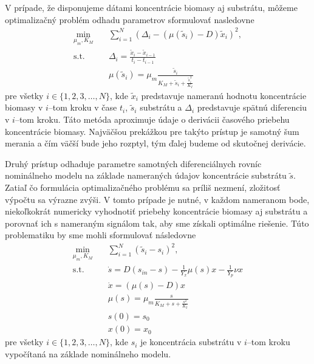 V prípade, že disponujeme dátami koncentrácie biomasy aj substrátu, môžeme optimalizačný problém odhadu parametrov sformulovať nasledovne
\begin{equation}
\label{eq:twostep_der_app}
	\begin{split}
		\min_{\mu_{m},K_{M}} \quad &\sum_{i=1}^{N} \left(\Delta_{i} - \left(\mu(\tilde{s}_{i}) - D\right)\tilde{x}_{i}\right)^2, \\
		\text{s.t.} \quad &\Delta_{i} = \frac{\tilde{x}_{i} - \tilde{x}_{i-1}}{t_{i} - t_{i-1}} \\
		\quad &\mu(\tilde{s}_{i})=\mu_{m}\frac{\tilde{s}_{i}}{K_{M} + \tilde{s}_{i} + \frac{\tilde{s}_{i}^2}{K_{I}}}
	\end{split}
\end{equation} 
pre všetky $ i \in \lbrace 1,2,3,\dots,N \rbrace $, kde $ \tilde{x}_{i} $ predstavuje nameranú hodnotu koncentrácie biomasy v $ i $--tom kroku v čase $ t_i $, $ \tilde{s}_{i} $ substrátu a $ \Delta_{i} $ predstavuje spätnú diferenciu v $ i $--tom kroku. Táto metóda aproximuje údaje o derivácii časového priebehu koncentrácie biomasy. Najväčšou prekážkou pre takýto prístup je samotný šum merania a čím väčší bude jeho rozptyl, tým ďalej budeme od skutočnej derivácie.

Druhý prístup odhaduje parametre samotných diferenciálnych rovníc nominálneho modelu na základe nameraných údajov koncentrácie substrátu $ \tilde{s} $. Zatiaľ čo formulácia optimalizačného problému sa príliš nezmení, zložitosť výpočtu sa výrazne zvýši. V tomto prípade je nutné, v každom nameranom bode, niekoľkokrát numericky vyhodnotiť priebehy koncentrácie biomasy aj substrátu a porovnať ich s nameraným signálom  tak, aby sme získali optimálne riešenie. Túto problematiku by sme mohli sformulovať následovne
\begin{equation}
\label{eq:twostep_diff_pe}
	\begin{split}
		\min_{\mu_{m},K_{M}} \quad & \sum_{i=1}^{N} \left(\tilde{s}_{i}-s_{i}\right)^2, \\
		\textrm{s.t.} \quad & \dot{s} = D(s_{in}-s)-\frac{1}{Y_x}\mu(s)x-\frac{1}{Y_p}\nu x \\
		& \dot{x} = (\mu(s)-D)x \\
		& \mu(s)=\mu_{m}\frac{s}{K_{M} + s + \frac{s^2}{K_{I}}} \\
		& s(0) = s_0 \\
		& x(0) = x_0
	\end{split}
\end{equation}
pre všetky $ i \in \lbrace 1,2,3,\dots,N \rbrace $, kde $ s_{i} $ je koncentrácia substrátu v $ i $--tom kroku vypočítaná na základe nominálneho modelu.

